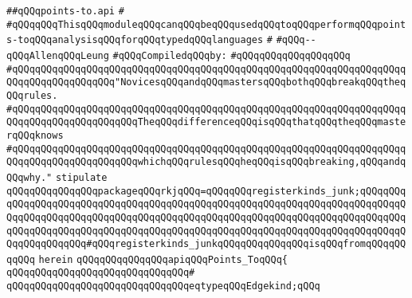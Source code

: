 \label{src/lib/compiler/back/low/aliasing/points-to.api}
\verb|##qQQqpoints-to.api|\newline
\verb|#|\newline
\verb|#qQQqqQQqThisqQQqmoduleqQQqcanqQQqbeqQQqusedqQQqtoqQQqperformqQQqpoints-toqQQqanalysisqQQqforqQQqtypedqQQqlanguages|\newline
\verb|#|\newline
\verb|#qQQq--qQQqAllenqQQqLeung|\newline
\newline
\verb|#qQQqCompiledqQQqby:|\newline
\verb|#qQQqqQQqqQQqqQQqqQQq|\newline
\newline
\verb|#qQQqqQQqqQQqqQQqqQQqqQQqqQQqqQQqqQQqqQQqqQQqqQQqqQQqqQQqqQQqqQQqqQQqqQQqqQQqqQQqqQQqqQQq"NovicesqQQqandqQQqmastersqQQqbothqQQqbreakqQQqtheqQQqrules.|\newline
\verb|#qQQqqQQqqQQqqQQqqQQqqQQqqQQqqQQqqQQqqQQqqQQqqQQqqQQqqQQqqQQqqQQqqQQqqQQqqQQqqQQqqQQqqQQqqQQqTheqQQqdifferenceqQQqisqQQqthatqQQqtheqQQqmasterqQQqknows|\newline
\verb|#qQQqqQQqqQQqqQQqqQQqqQQqqQQqqQQqqQQqqQQqqQQqqQQqqQQqqQQqqQQqqQQqqQQqqQQqqQQqqQQqqQQqqQQqqQQqwhichqQQqrulesqQQqheqQQqisqQQqbreaking,qQQqandqQQqwhy."|\newline
\newline
\newline
\newline
\verb|stipulate|\newline
\verb|qQQqqQQqqQQqqQQqpackageqQQqrkjqQQq=qQQqqQQqregisterkinds_junk;qQQqqQQqqQQqqQQqqQQqqQQqqQQqqQQqqQQqqQQqqQQqqQQqqQQqqQQqqQQqqQQqqQQqqQQqqQQqqQQqqQQqqQQqqQQqqQQqqQQqqQQqqQQqqQQqqQQqqQQqqQQqqQQqqQQqqQQqqQQqqQQqqQQqqQQqqQQqqQQqqQQqqQQqqQQqqQQqqQQqqQQqqQQqqQQqqQQqqQQqqQQqqQQqqQQqqQQqqQQqqQQqqQQqqQQq#qQQqregisterkinds_junkqQQqqQQqqQQqqQQqisqQQqfromqQQqqQQqqQQq|\newline
\verb|herein|\newline
\newline
\verb|qQQqqQQqqQQqqQQqapiqQQqPoints_ToqQQq{|\newline
\verb|qQQqqQQqqQQqqQQqqQQqqQQqqQQqqQQq#|\newline
\verb|qQQqqQQqqQQqqQQqqQQqqQQqqQQqqQQqeqtypeqQQqEdgekind;qQQq|\newline
